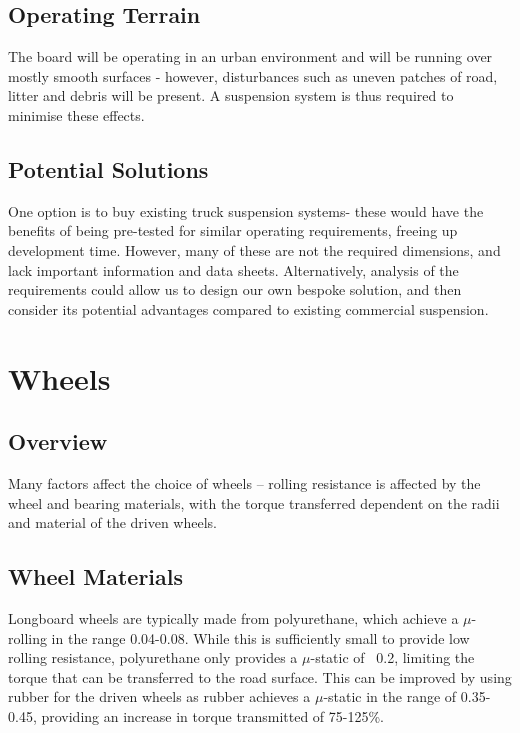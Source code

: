 \documentclass[journal,10pt]{IEEEtran}
\begin{document}
    \subsection{Operating Terrain}
        The board will be operating in an urban environment and will be running over mostly smooth surfaces - however, disturbances such as uneven patches of road, litter and debris will be present. A suspension system is thus required to minimise these effects.
    \subsection{Potential Solutions}
        One option is to buy existing truck suspension systems- these would have the benefits of being pre-tested for similar operating requirements, freeing up development time. However, many of these are not the required dimensions, and lack important information and data sheets. Alternatively, analysis of the requirements could allow us to design our own bespoke solution, and then consider its potential advantages compared to existing commercial suspension. 
\section{Wheels}
    \subsection{Overview}
        Many factors affect the choice of wheels – rolling resistance is affected by the wheel and bearing materials, with the torque transferred dependent on the radii and material of the driven wheels.
    \subsection{Wheel Materials}
        Longboard wheels are typically made from polyurethane, which achieve a $\mu$-rolling in the range 0.04-0.08. While this is sufficiently small to provide low rolling resistance, polyurethane only provides a $\mu$-static of ~0.2, limiting the torque that can be transferred to the road surface. This can be improved by using rubber for the driven wheels as rubber achieves a $\mu$-static in the range of 0.35-0.45, providing an increase in torque transmitted of 75-125\%.
\end{document}
